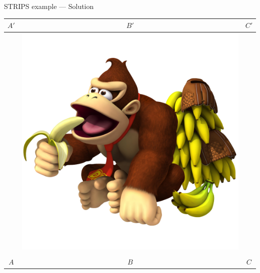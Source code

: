 \begin{frame}[fragile]{STRIPS example --- Solution}
	\begin{center}
			\begin{tabular}{c|c|c}
				  $A'$  &   $B'$  &   $C'$  \\\hline
				\emptyy & \includegraphics[height=0.2\textheight]{monkey_hasbananas} & \emptyy \\
				\emptyy & \boxbox & \emptyy \\\hline
				  $A$   &   $B$   &    $C$
			\end{tabular}
	\end{center}
\end{frame}

